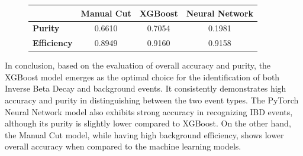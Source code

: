 \begin{figure}[h!]
	\centering
	\begin{minipage}{0.6\textwidth}
		\centering
		\begin{tabular}{lccc}
			\toprule
			& \textbf{Manual Cut} & \textbf{XGBoost} & \textbf{Neural Network} \\
			\midrule
			\textbf{Purity} & 0.6610 & 0.7054 & 0.1981 \\
			\textbf{Efficiency} & 0.8949 & 0.9160 & 0.9158 \\
			\bottomrule
		\end{tabular}
	\end{minipage}
\end{figure}
	
In conclusion, based on the evaluation of overall accuracy and purity, the XGBoost model emerges as the optimal choice for the identification of both Inverse Beta Decay and background  events. It consistently demonstrates high accuracy and purity in distinguishing between the two event types. The PyTorch Neural Network model also exhibits strong accuracy in recognizing IBD events, although its purity is slightly lower compared to XGBoost. On the other hand, the Manual Cut model, while having high background efficiency, shows lower overall accuracy when compared to the machine learning models.




